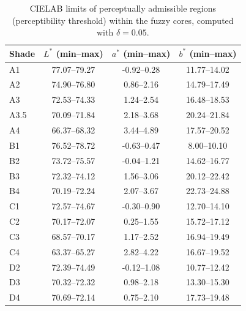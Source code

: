 \begin{table}[htbp]
\centering
\caption{CIELAB limits of perceptually admissible regions (perceptibility threshold) within the fuzzy cores, computed with $\delta=0.05$.}
\begin{tabular}{lccc}
\toprule
Shade & $L^*$ (min--max) & $a^*$ (min--max) & $b^*$ (min--max) \\
\midrule
A1 & 77.07--79.27 & -0.92--0.28 & 11.77--14.02 \\
A2 & 74.90--76.80 & 0.86--2.16 & 14.79--17.49 \\
A3 & 72.53--74.33 & 1.24--2.54 & 16.48--18.53 \\
A3.5 & 70.09--71.84 & 2.18--3.68 & 20.24--21.84 \\
A4 & 66.37--68.32 & 3.44--4.89 & 17.57--20.52 \\
B1 & 76.52--78.72 & -0.63--0.47 & 8.00--10.10 \\
B2 & 73.72--75.57 & -0.04--1.21 & 14.62--16.77 \\
B3 & 72.32--74.12 & 1.56--3.06 & 20.12--22.42 \\
B4 & 70.19--72.24 & 2.07--3.67 & 22.73--24.88 \\
C1 & 72.57--74.67 & -0.30--0.90 & 12.70--14.10 \\
C2 & 70.17--72.07 & 0.25--1.55 & 15.72--17.12 \\
C3 & 68.57--70.17 & 1.17--2.52 & 16.94--19.49 \\
C4 & 63.37--65.27 & 2.82--4.22 & 16.67--19.52 \\
D2 & 72.39--74.49 & -0.12--1.08 & 10.77--12.42 \\
D3 & 70.32--72.32 & 0.98--2.18 & 13.30--15.30 \\
D4 & 70.69--72.14 & 0.75--2.10 & 17.73--19.48 \\
\bottomrule
\end{tabular}
\label{tab:core_limits_pt}
\end{table}
